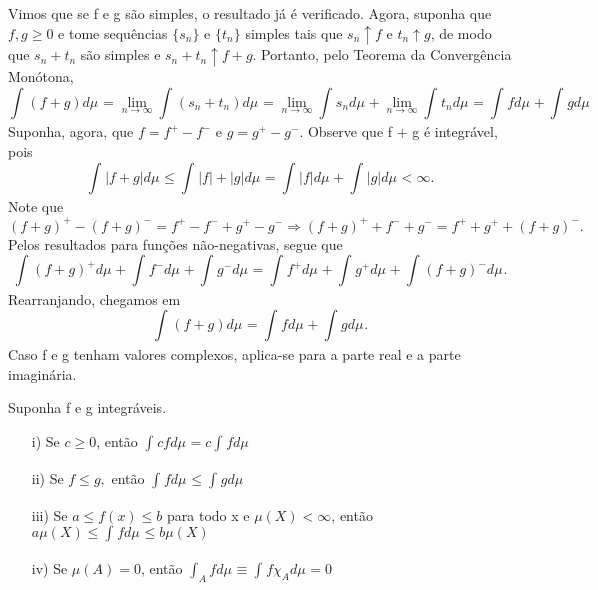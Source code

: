 \documentclass[MeasureTheory/measure_theory.tex]{subfiles}
\begin{document}
\begin{proof*}
	Vimos que se f e g são simples, o resultado já é verificado. Agora, suponha que \(f, g \geq 0\) e tome sequências \(\{s_{n}\}\) e \(\{t_{n}\}\) simples tais que
	\(s_{n}\uparrow f\) e \(t_{n}\uparrow g\), de modo que \(s_{n}+t_{n}\) são simples e \(s_{n}+t_{n}\uparrow f+g\). Portanto, pelo Teorema da Convergência Monótona,
	\[
		\int_{}(f+g) d\mu_{} = \lim_{n\to \infty}\int_{}(s_{n} + t_{n}) d\mu_{} = \lim_{n\to \infty}\int_{}s_{n} d\mu_{} + \lim_{n\to \infty}\int_{}t_{n} d\mu_{} = \int_{}f d\mu_{} + \int_{}g d\mu_{}
	\]
	Suponha, agora, que \(f = f^{+} - f^{-}\) e \(g = g^{+}-g^{-}.\) Observe que f + g é integrável, pois
	\[
		\int_{}|f+g| d\mu_{} \leq \int_{}|f| + |g| d\mu_{} = \int_{}|f| d\mu_{} + \int_{}|g| d\mu_{} < \infty.
	\]
	Note que
	\[
		(f+g)^{+} - (f+g)^{-} = f^{+} - f^{-} + g^{+}-g^{-} \Rightarrow (f+g)^{+} + f^{-} + g^{-} = f^{+} + g^{+} + (f+g)^{-}.
	\]
	Pelos resultados para funções não-negativas, segue que
	\[
		\int_{}(f+g)^{+} d\mu_{} + \int_{}f^{-} d\mu_{} + \int_{}g^{-} d\mu_{} = \int_{}f^{+} d\mu_{} + \int_{}g^{+} d\mu_{} + \int_{}(f+g)^{-} d\mu_{}.
	\]
	Rearranjando, chegamos em
	\[
		\int_{}(f+g) d\mu_{} = \int_{}f d\mu_{} + \int_{}g d\mu_{}.
	\]
	Caso f e g tenham valores complexos, aplica-se para a parte real e a parte imaginária. \qedsymbol
\end{proof*}
\begin{prop*}
	Suponha f e g integráveis.
	\begin{itemize}
		\item[i)] Se \(c\geq 0\), então \(\int_{}cf d\mu_{} = c \int_{}f d\mu_{}\)
		\item[ii)] Se \(f \leq g,\) então \(\int_{}f d\mu_{} \leq \int_{}g d\mu_{}\)
		\item[iii)] Se \(a\leq f(x) \leq b\) para todo x e \(\mu (X) < \infty\), então \(a\mu (X) \leq \int_{}f d\mu_{} \leq b\mu (X)\)
		\item[iv)] Se \(\mu (A) = 0\), então \(\int_{A}f d\mu_{}\equiv \int_{}f \chi_{A} d\mu_{} = 0\)
	\end{itemize}
\end{prop*}
\end{document}
